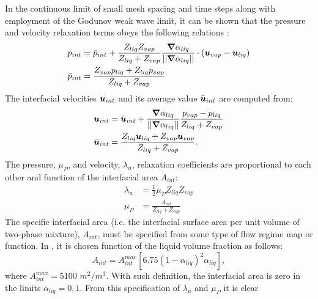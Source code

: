 In the continuous limit of small mesh spacing and time steps along with employment of the Godunov weak wave limit, it can be shown that the pressure and velocity relaxation terms obeys the following relations \cite{Berry_2008b, Chinnayya_2004}:
%
\begin{align}
  \label{E-R:83}
  p_{int} &= \bar{p}_{int} + \frac{Z_{liq}Z_{vap}}{Z_{liq}+Z_{vap}} \frac{\boldsymbol{\nabla} \alpha_{liq}}{|| \boldsymbol{\nabla} \alpha_{liq} ||} \cdot (\boldsymbol u_{vap}-\boldsymbol u_{liq})
  \\
  \bar{p}_{int} &= \frac{Z_{vap}p_{liq}+Z_{liq}p_{vap}}{Z_{liq}+Z_{vap}}
\end{align}
%
The interfacial velocities $\boldsymbol u_{int}$ and its average value $\bar{\boldsymbol u}_{int}$ are computed from:
%
\begin{align}
  \label{E-R:84}
  \boldsymbol u_{int} &= \bar{\boldsymbol u}_{int} +  \frac{\boldsymbol{\nabla} \alpha_{liq}}{|| \boldsymbol{\nabla} \alpha_{liq} ||} \frac{p_{vap}-p_{liq}}{Z_{liq}+Z_{vap}}
  \\
  \bar{\boldsymbol u}_{int} &= \frac{Z_{liq} \boldsymbol u_{liq}+Z_{vap}\boldsymbol u_{vap}}{Z_{liq}+Z_{vap}}.
\end{align}
%
The pressure, $\mu_P$, and velocity, $\lambda_u$, relaxation coefficients are proportional to each other and function of the interfacial area $A_{int}$:
%
\begin{align}
  \label{E-R:85}
  \lambda_u &= \frac{1}{2} \mu_P Z_{liq} Z_{vap}
  \\
  \label{E-R:86}
  \mu_P &= \frac{A_{int}}{Z_{liq}+Z_{vap}}
\end{align}
The specific interfacial area (i.e. the interfacial surface area per unit
volume of two-phase mixture), $A_{int}$, must be specified from some type of
flow regime map or function. In \cite{SEM}, it is chosen function of the liquid volume fraction as follows:
%
\begin{equation}
A_{int} = A_{int}^{max} \left[ 6.75 \left(1-\alpha_{liq} \right)^2 \alpha_{liq} \right],
\end{equation}
% 
where $A_{int}^{max} = 5100$ $m^2 / m^3$. With such definition, the interfacial area is zero in the limits $\alpha_{liq} = 0,1$. 
From this specification of $\lambda_u$ and $\mu_P$ it is clear
